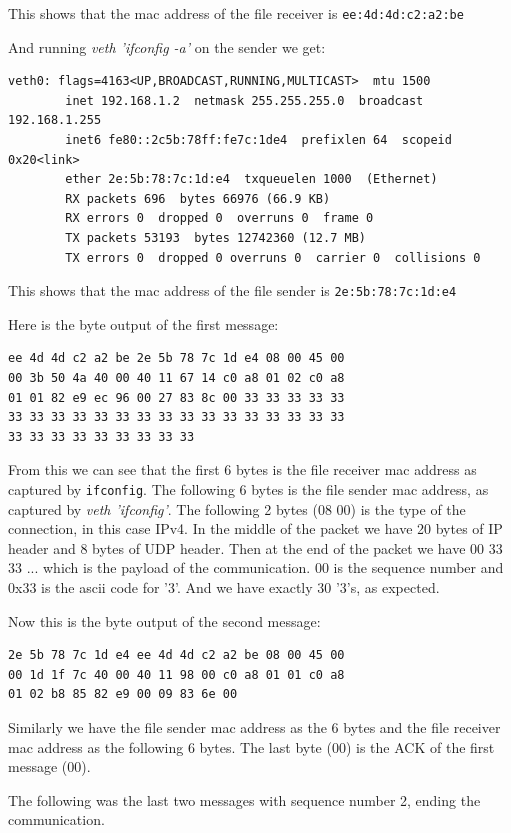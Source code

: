 \documentclass[paper=a4, fontsize=11pt]{scrartcl}
\numberwithin{equation}{section}		%
\numberwithin{figure}{section}			%
\numberwithin{table}{section}				%
\begin{document}
This shows that the mac address of the file receiver is \texttt{ee:4d:4d:c2:a2:be}

And running \textit{veth 'ifconfig -a'} on the sender we get:
\begin{lstlisting}
veth0: flags=4163<UP,BROADCAST,RUNNING,MULTICAST>  mtu 1500
        inet 192.168.1.2  netmask 255.255.255.0  broadcast 192.168.1.255
        inet6 fe80::2c5b:78ff:fe7c:1de4  prefixlen 64  scopeid 0x20<link>
        ether 2e:5b:78:7c:1d:e4  txqueuelen 1000  (Ethernet)
        RX packets 696  bytes 66976 (66.9 KB)
        RX errors 0  dropped 0  overruns 0  frame 0
        TX packets 53193  bytes 12742360 (12.7 MB)
        TX errors 0  dropped 0 overruns 0  carrier 0  collisions 0
\end{lstlisting}

This shows that the mac address of the file sender is \texttt{2e:5b:78:7c:1d:e4}

Here is the byte output of the first message:
\begin{lstlisting}
ee 4d 4d c2 a2 be 2e 5b 78 7c 1d e4 08 00 45 00
00 3b 50 4a 40 00 40 11 67 14 c0 a8 01 02 c0 a8
01 01 82 e9 ec 96 00 27 83 8c 00 33 33 33 33 33
33 33 33 33 33 33 33 33 33 33 33 33 33 33 33 33
33 33 33 33 33 33 33 33 33
\end{lstlisting}

From this we can see that the first 6 bytes is the file receiver mac address
as captured by \texttt{ifconfig}.
The following 6 bytes is the file sender mac address, as captured by \textit{veth 'ifconfig'}.
The following 2 bytes (08 00) is the type of the connection, in this case IPv4.
In the middle of the packet we have 20 bytes of IP header and 8 bytes of UDP header.
Then at the end of the packet we have 00 33 33 ... which is the payload of the communication.
00 is the sequence number and 0x33 is the ascii code for '3'. And we have exactly 30 '3's, as expected.

Now this is the byte output of the second message:
\begin{lstlisting}
2e 5b 78 7c 1d e4 ee 4d 4d c2 a2 be 08 00 45 00
00 1d 1f 7c 40 00 40 11 98 00 c0 a8 01 01 c0 a8
01 02 b8 85 82 e9 00 09 83 6e 00
\end{lstlisting}

Similarly we have the file sender mac address as the 6 bytes and the file receiver mac address as the following 6 bytes.
The last byte (00) is the ACK of the first message (00).


The following was the last two messages with sequence number 2,
ending the communication.
\end{document}
